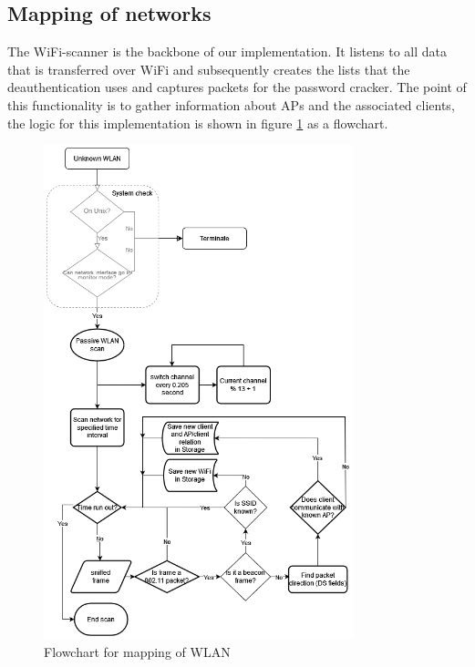 \subsection{Mapping of networks}
The WiFi-scanner is the backbone of our implementation. It listens to all data that is transferred over WiFi and subsequently creates the lists that the deauthentication uses and captures packets for the password cracker. The point of this functionality is to gather information about APs and the associated clients, the logic for this implementation is shown in figure \ref{Flowchart} as a flowchart.

\newpage

\begin{figure}[!htbp]
    \centering
    \includegraphics[width=0.8\textwidth]{Latex-Files/Billeder/Flowcharts/network_flowchart.png}
    \caption{Flowchart for mapping of WLAN}
    \label{Flowchart}
\end{figure}

\newpage

